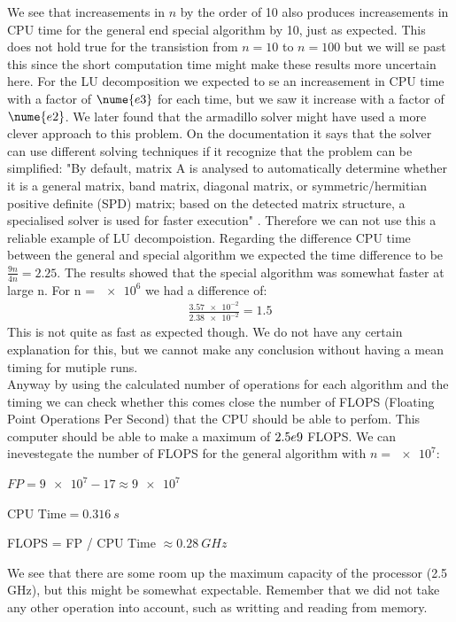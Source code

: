 \documentclass[american,a4paper,12pt]{article}
\begin{document}
We see that increasements in $n$ by the order of 10 also produces increasements in CPU time for the general end special algorithm by 10, just as expected. This does not hold true for the transistion from $n = 10$ to $n = 100$ but we will se past this since the short computation time might make these results more uncertain here. For the LU decomposition we expected to se an increasement in CPU time with a factor of $\nume{e3}$ for each time, but we saw it increase with a factor of $\nume{e2}$. We later found that the armadillo solver might have used a more clever approach to this problem. On the documentation it says that the solver can use different solving techniques if it recognize that the problem can be simplified: "By default, matrix A is analysed to automatically determine whether it is a general matrix, band matrix, diagonal matrix, or symmetric/hermitian positive definite (SPD) matrix; based on the detected matrix structure, a specialised solver is used for faster execution" \cite{Armadillo}. Therefore we can not use this a reliable example of LU decompoistion. Regarding the difference CPU time between the general and special algorithm we expected the time difference to be $\frac{9n}{4n} = 2.25$. The results showed that the special algorithm was somewhat faster at large n. For n = $\num{e6}$ we had a difference of:
\begin{align*}
  \frac{\num{3.57e-2}}{\num{2.38e-2}} = 1.5
\end{align*}
This is not quite as fast as expected though. We do not have any certain explanation for this, but we cannot make any conclusion without having a mean timing for mutiple runs.\\
Anyway by using the calculated number of operations for each algorithm and the timing we can check whether this comes close the number of FLOPS (Floating Point Operations Per Second) that the CPU should be able to perfom. This computer should be able to make a maximum of $\num2.5e9$ FLOPS. We can inevestegate the number of FLOPS for the general algorithm with $n = \num{e7}$:
\begin{center}
  $FP = \num{9e7} - 17 \approx \num{9e7}$
\end{center}
\begin{center}
  $\text{CPU Time} = 0.316 \ s$
\end{center}
\begin{center}
  FLOPS = FP / CPU Time $\approx 0.28 \ GHz$
\end{center}
We see that there are some room up the maximum capacity of the processor (2.5 GHz), but this might be somewhat expectable. Remember that we did not take any other operation into account, such as writting and reading from memory.
\end{document}
